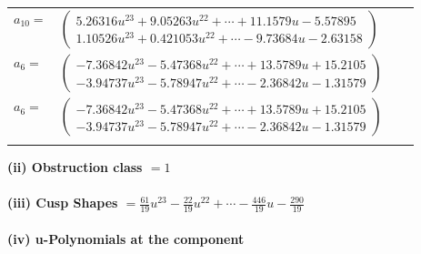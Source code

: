 \documentclass[1p]{elsarticle_modified}
\theoremstyle{definition}
\begin{document}
\begin{tabular}{m{7pt} m{180pt} m{7pt} m{180pt} }
\flushright $a_{10}=$&$\begin{pmatrix}5.26316 u^{23}+9.05263 u^{22}+\cdots+11.1579 u-5.57895\\1.10526 u^{23}+0.421053 u^{22}+\cdots-9.73684 u-2.63158\end{pmatrix}$ \\
\flushright $a_{6}=$&$\begin{pmatrix}-7.36842 u^{23}-5.47368 u^{22}+\cdots+13.5789 u+15.2105\\-3.94737 u^{23}-5.78947 u^{22}+\cdots-2.36842 u-1.31579\end{pmatrix}$\\ \flushright $a_{6}=$&$\begin{pmatrix}-7.36842 u^{23}-5.47368 u^{22}+\cdots+13.5789 u+15.2105\\-3.94737 u^{23}-5.78947 u^{22}+\cdots-2.36842 u-1.31579\end{pmatrix}$\\&\end{tabular}
\flushleft \textbf{(ii) Obstruction class $= 1$}\\~\\
\flushleft \textbf{(iii) Cusp Shapes $= \frac{61}{19} u^{23}-\frac{22}{19} u^{22}+\cdots-\frac{446}{19} u-\frac{290}{19}$}\\~\\
\newpage\renewcommand{\arraystretch}{1}
\flushleft \textbf{(iv) u-Polynomials at the component}\newline \\
\end{document}
